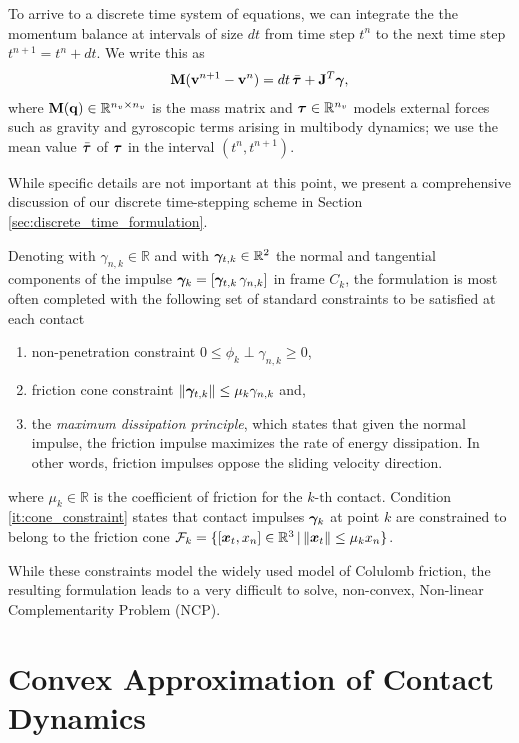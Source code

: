To arrive to a discrete time system of equations, we can integrate the the
momentum balance at intervals of size $dt$ from time step $t^n$ to the
next time step $t^{n+1}=t^n+dt$. We write this as
\begin{eqnarray}
	\mf{M}(\mf{v}^{n+1}-\mf{v}^n)  = dt\,\bar{\vf{\tau}} + \mf{J}^T\mf{\bgamma},
	\label{eq:momentum_balance}
\end{eqnarray}
where ${\mathbf{M}}({\mathbf{q}})\in\mathbb{R}^{n_v\times n_v}$ is the mass matrix and
${\bm{\tau}}\in\mathbb{R}^{n_v}$ models external forces such as gravity and
gyroscopic terms arising in multibody dynamics; we use the mean value
$\bar{{\bm{\tau}}}$ of ${{\bm{\tau}}}$ in the interval $(t^n,t^{n+1})$.

While specific details are not important at this point, we present a
comprehensive discussion of our discrete time-stepping scheme in Section
\ref{sec:discrete_time_formulation}.

Denoting with $\gamma_{n,k} \in \mathbb{R}$ and with ${\bm\gamma}_{t,k} \in
\mathbb{R}^2$ the normal and tangential components of the impulse
${\bm\gamma}_k=[{\bm\gamma}_{t,k}\,\gamma_{n,k}]$ in frame $C_k$, the formulation is
most often completed with the following set of standard constraints to be
satisfied at each contact
\begin{enumerate}
	\item non-penetration constraint $0\le\phi_k\perp\gamma_{n,k}\ge0$,
	\item\label{it:cone_constraint} friction cone constraint
	$\Vert{\bm\gamma}_{t,k}\Vert\le \mu_k\gamma_{n,k}$ and,
	\item the \emph{maximum dissipation principle}, which states that given the
	normal impulse, the friction impulse maximizes the rate of energy
	dissipation. In other words, friction impulses oppose the sliding velocity
	direction.
\end{enumerate}
where $\mu_k \in \mathbb{R}$ is the coefficient of friction for the
$k\text{-th}$ contact. Condition \ref{it:cone_constraint} states that contact
impulses ${\bm\gamma}_k$ at point $k$ are constrained to belong to the friction cone
$\mathcal{F}_k=\{[{\bm{x}}_t, x_n] \in\mathbb{R}^3 \,|\, \Vert{\bm{x}}_t\Vert\le
\mu_k x_n\}$.

While these constraints model the widely used model of Colulomb friction, the
resulting formulation leads to a very difficult to solve, non-convex, Non-linear
Complementarity Problem (NCP).

\section{Convex Approximation of Contact Dynamics}
\label{sec:previous_work}


